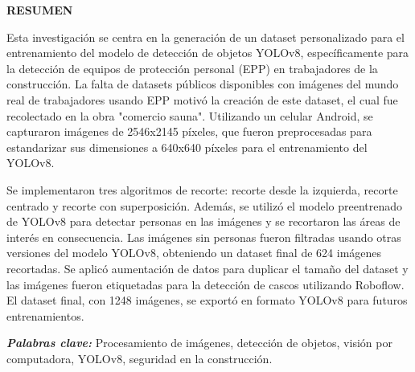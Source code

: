 \thispagestyle{plain}

\newpage

\begin{center}
  \textbf{RESUMEN}
\end{center}

\vspace{1cm}

Esta investigación se centra en la generación de un dataset personalizado para el entrenamiento del modelo de detección de objetos YOLOv8, específicamente para la detección de equipos de protección personal (EPP) en trabajadores de la construcción. La falta de datasets públicos disponibles con imágenes del mundo real de trabajadores usando EPP motivó la creación de este dataset, el cual fue recolectado en la obra "comercio sauna". Utilizando un celular Android, se capturaron imágenes de 2546x2145 píxeles, que fueron preprocesadas para estandarizar sus dimensiones a 640x640 píxeles para el entrenamiento del YOLOv8.

Se implementaron tres algoritmos de recorte: recorte desde la izquierda, recorte centrado y recorte con superposición. Además, se utilizó el modelo preentrenado de YOLOv8 para detectar personas en las imágenes y se recortaron las áreas de interés en consecuencia. Las imágenes sin personas fueron filtradas usando otras versiones del modelo YOLOv8, obteniendo un dataset final de 624 imágenes recortadas. Se aplicó aumentación de datos para duplicar el tamaño del dataset y las imágenes fueron etiquetadas para la detección de cascos utilizando Roboflow. El dataset final, con 1248 imágenes, se exportó en formato YOLOv8 para futuros entrenamientos.

\textit{\textbf{Palabras clave:}} Procesamiento de imágenes, detección de objetos, visión por computadora, YOLOv8, seguridad en la construcción.

\vfill

\pagebreak